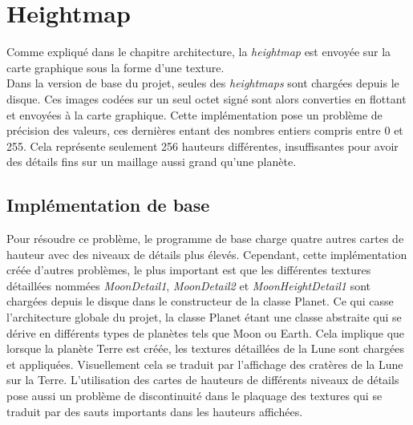     \section{Heightmap}
    Comme expliqué dans le chapitre architecture, la \emph{heightmap} est envoyée sur la carte graphique sous la forme
    d'une texture.\\
    Dans la version de base du projet, seules des \emph{heightmaps} sont chargées depuis le disque. Ces images codées sur un
    seul octet signé sont alors converties en flottant et envoyées à la carte graphique. Cette implémentation pose un problème de précision des valeurs, ces dernières entant des nombres entiers compris entre 0 et 255. Cela représente seulement 256 hauteurs différentes, insuffisantes pour avoir des détails fins sur un maillage aussi grand qu'une planète.
    
    \subsection{Implémentation de base}
    Pour résoudre ce problème, le programme de base charge quatre autres cartes de hauteur avec des niveaux de détails plus élevés. Cependant, cette implémentation créée d'autres problèmes, le plus important est que les différentes textures détaillées nommées \textit{MoonDetail1}, \textit{MoonDetail2} et \textit{MoonHeightDetail1} sont chargées depuis le disque dans le constructeur de la classe Planet. Ce qui casse l'architecture globale du projet, la classe Planet étant une classe abstraite qui se dérive en différents types de planètes tels que Moon ou Earth.
    Cela implique que lorsque la planète Terre est créée, les textures détaillées de la Lune sont chargées et appliquées.
    Visuellement cela se traduit par l'affichage des cratères de la Lune sur la Terre.
    L'utilisation des cartes de hauteurs de différents niveaux de détails pose aussi un problème de discontinuité dans le plaquage des textures qui se traduit par des sauts importants dans les hauteurs affichées.
     
